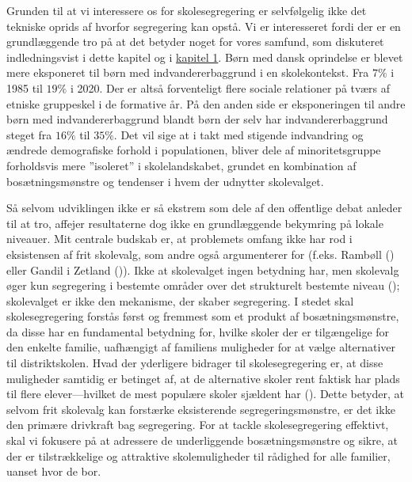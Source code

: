 \documentclass[
]{book}
\begin{document}
Grunden til at vi interessere os for skolesegregering er selvfølgelig ikke det tekniske oprids af hvorfor segregering kan opstå. Vi er interesseret fordi der er en grundlæggende tro på at det betyder noget for vores samfund, som diskuteret indledningsvist i dette kapitel og i \hyperref[kap1]{kapitel 1}. Børn med dansk oprindelse er blevet mere eksponeret til børn med indvandererbaggrund i en skolekontekst. Fra \(7\%\) i 1985 til \(19\%\) i 2020. Der er altså forventeligt flere sociale relationer på tværs af etniske gruppeskel i de formative år. På den anden side er eksponeringen til andre børn med indvandererbaggrund blandt børn der selv har indvandererbaggrund steget fra \(16\%\) til \(35\%\). Det vil sige at i takt med stigende indvandring og ændrede demografiske forhold i populationen, bliver dele af minoritetsgruppe forholdsvis mere ''isoleret'' i skolelandskabet, grundet en kombination af bosætningsmønstre og tendenser i hvem der udnytter skolevalget.

Så selvom udviklingen ikke er så ekstrem som dele af den offentlige debat anleder til at tro, affejer resultaterne dog ikke en grundlæggende bekymring på lokale niveauer. Mit centrale budskab er, at problemets omfang ikke har rod i eksistensen af frit skolevalg, som andre også argumenterer for (f.eks. Rambøll () eller Gandil i Zetland ()). Ikke at skolevalget ingen betydning har, men skolevalg øger kun segregering i bestemte områder over det strukturelt bestemte niveau (); skolevalget er ikke den mekanisme, der skaber segregering. I stedet skal skolesegregering forstås først og fremmest som et produkt af bosætningsmønstre, da disse har en fundamental betydning for, hvilke skoler der er tilgængelige for den enkelte familie, uafhængigt af familiens muligheder for at vælge alternativer til distriktskolen. Hvad der yderligere bidrager til skolesegregering er, at disse muligheder samtidig er betinget af, at de alternative skoler rent faktisk har plads til flere elever---hvilket de mest populære skoler sjældent har (). Dette betyder, at selvom frit skolevalg kan forstærke eksisterende segregeringsmønstre, er det ikke den primære drivkraft bag segregering. For at tackle skolesegregering effektivt, skal vi fokusere på at adressere de underliggende bosætningsmønstre og sikre, at der er tilstrækkelige og attraktive skolemuligheder til rådighed for alle familier, uanset hvor de bor.
\end{document}

